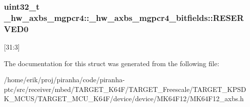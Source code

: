\subsubsection[{\texorpdfstring{R\+E\+S\+E\+R\+V\+E\+D0}{RESERVED0}}]{\setlength{\rightskip}{0pt plus 5cm}uint32\+\_\+t \+\_\+hw\+\_\+axbs\+\_\+mgpcr4\+::\+\_\+hw\+\_\+axbs\+\_\+mgpcr4\+\_\+bitfields\+::\+R\+E\+S\+E\+R\+V\+E\+D0}\hypertarget{struct__hw__axbs__mgpcr4_1_1__hw__axbs__mgpcr4__bitfields_a8a43721af1c8aee89e3041e581a890a2}{}\label{struct__hw__axbs__mgpcr4_1_1__hw__axbs__mgpcr4__bitfields_a8a43721af1c8aee89e3041e581a890a2}
\mbox{[}31\+:3\mbox{]} 

The documentation for this struct was generated from the following file\+:\begin{DoxyCompactItemize}
\item 
/home/erik/proj/piranha/code/piranha-\/ptc/src/receiver/mbed/\+T\+A\+R\+G\+E\+T\+\_\+\+K64\+F/\+T\+A\+R\+G\+E\+T\+\_\+\+Freescale/\+T\+A\+R\+G\+E\+T\+\_\+\+K\+P\+S\+D\+K\+\_\+\+M\+C\+U\+S/\+T\+A\+R\+G\+E\+T\+\_\+\+M\+C\+U\+\_\+\+K64\+F/device/device/\+M\+K64\+F12/M\+K64\+F12\+\_\+axbs.\+h\end{DoxyCompactItemize}
